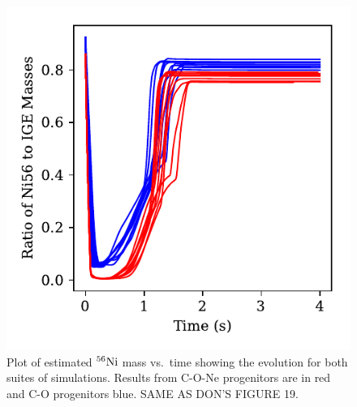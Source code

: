 \documentclass[iop,apj]{emulateapj}
\newcommand{\Ni}[1]{\ensuremath{{}^{#1}{\rm Ni}}}
\begin{document}
\begin{figure}
\includegraphics[width=\columnwidth]{figures/RatioNi56IGE_v_time_plot.pdf}
\caption{\label{fig:compare_ratio}
Plot of estimated \Ni{56} mass vs.\ time showing the evolution
for both suites of simulations. Results from 
C-O-Ne progenitors are in red and C-O progenitors blue. 
{\color{red} SAME AS DON'S FIGURE 19}.
}
\end{figure}
\end{document}
